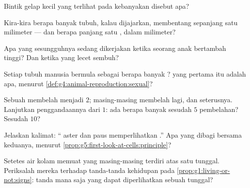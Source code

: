 \begin{exercise}[$\star$]\label{exo:g5:first-look-at-cells:4}
Bintik gelap kecil yang terlihat pada kebanyakan  disebut apa?
\end{exercise}

\begin{exercise}[$\star$]\label{exo:g5:first-look-at-cells:5}
Kira-kira berapa banyak  tubuh, kalau dijajarkan, membentang
sepanjang satu milimeter --- dan berapa panjang satu , dalam
milimeter?
\end{exercise}

\begin{exercise}[$\star$]\label{exo:g5:first-look-at-cells:6}
Apa yang sesungguhnya sedang dikerjakan  ketika seorang anak
bertambah tinggi? Dan ketika  yang lecet sembuh?
\end{exercise}

\begin{exercise}[$\star$]\label{exo:g5:first-look-at-cells:7}
Setiap tubuh manusia bermula sebagai berapa banyak ?  yang
pertama itu adalah apa, menurut
\cref{def:g4:animal-reproduction:sexual}?
\end{exercise}

\begin{exercise}[$\star$]\label{exo:g5:first-look-at-cells:8}
Sebuah  membelah menjadi $2$; masing-masing membelah lagi, dan
seterusnya. Lanjutkan penggandaannya dari $1$: ada berapa banyak 
sesudah $5$ pembelahan? Sesudah $10$?
\end{exercise}

\begin{exercise}[$\star\star$]\label{exo:g5:first-look-at-cells:9}
Jelaskan kalimat: `` aster dan paus memperlihatkan .'' Apa yang dibagi bersama keduanya, menurut
\cref{prop:g5:first-look-at-cells:principle}?
\end{exercise}

\begin{exercise}[$\star\star$]\label{exo:g5:first-look-at-cells:10}
Setetes air kolam memuat  yang masing-masing terdiri atas
satu  tunggal. Periksalah mereka terhadap tanda-tanda kehidupan
pada \cref{prop:g1:living-or-not:signs}: tanda mana saja yang dapat
diperlihatkan sebuah  tunggal?
\end{exercise}


